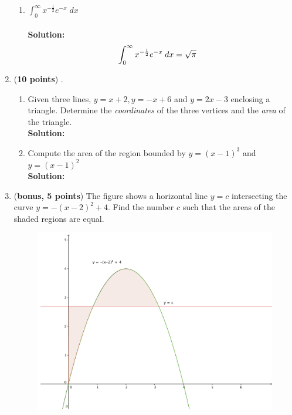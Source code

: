\documentclass[a4paper]{article}
\begin{document}
\begin{enumerate}
\begin{enumerate}
	
	
	\item $\int_0^\infty x^{-\frac{1}{2}}e^{-x} \; dx$\\ \relax
	[Hint: Substitute $u = \sqrt{x}$ and, at the end, some information from a previous exercise turns out to be useful.]\\
	\textbf{Solution:}\\	


\begin{align}
\int_0^\infty x^{-\frac{1}{2}}e^{-x} \; dx &= \sqrt{\pi}\notag
\end{align}	



\end{enumerate}


\item (\textbf{10 points}) .


\begin{enumerate}
	\item Given three lines, $y = x + 2, y = -x + 6$ and $y = 2x - 3$ enclosing a triangle. Determine the \textit{coordinates} of the three vertices and the \textit{area} of the triangle.\\
	\textbf{Solution:}\\


	\item Compute the area of the region bounded by $y = (x - 1)^3$ and $y = (x - 1)^2$\\
	\textbf{Solution:}\\
\end{enumerate}

\newpage

\item (\textbf{bonus, 5 points}) The figure shows a horizontal line $y = c$ intersecting the curve $y = -(x - 2)^2 + 4$. Find the number $c$ such that the areas of the shaded regions are equal.


\begin{figure}[ht!]
	\centering
  \includegraphics[width=1.2\textwidth]{seven.PNG}
\end{figure}	


\end{enumerate}
\end{document}
